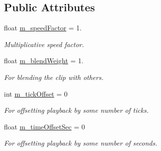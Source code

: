 \subsection*{Public Attributes}
\begin{DoxyCompactItemize}
\item 
\mbox{\label{structrev_1_1_animation_settings_a80fb275fac210ee41115e80625e9ffb1}} 
float \mbox{\hyperlink{structrev_1_1_animation_settings_a80fb275fac210ee41115e80625e9ffb1}{m\+\_\+speed\+Factor}} = 1.
\begin{DoxyCompactList}\small\item\em Multiplicative speed factor. \end{DoxyCompactList}\item 
\mbox{\label{structrev_1_1_animation_settings_a73705b7991a16099dccee39eba140d2f}} 
float \mbox{\hyperlink{structrev_1_1_animation_settings_a73705b7991a16099dccee39eba140d2f}{m\+\_\+blend\+Weight}} = 1.
\begin{DoxyCompactList}\small\item\em For blending the clip with others. \end{DoxyCompactList}\item 
\mbox{\label{structrev_1_1_animation_settings_ad3bc64855c887bd0aa2e90562e0eea65}} 
int \mbox{\hyperlink{structrev_1_1_animation_settings_ad3bc64855c887bd0aa2e90562e0eea65}{m\+\_\+tick\+Offset}} = 0
\begin{DoxyCompactList}\small\item\em For offsetting playback by some number of ticks. \end{DoxyCompactList}\item 
\mbox{\label{structrev_1_1_animation_settings_a5cdfdb718b84619d74c3c5c46d46101b}} 
float \mbox{\hyperlink{structrev_1_1_animation_settings_a5cdfdb718b84619d74c3c5c46d46101b}{m\+\_\+time\+Offset\+Sec}} = 0
\begin{DoxyCompactList}\small\item\em For offsetting playback by some number of seconds. \end{DoxyCompactList}\item 
\mbox{\label{structrev_1_1_animation_settings_a1b221d0d02069dc93448b625435fd21d}} 

\end{DoxyCompactItemize}
